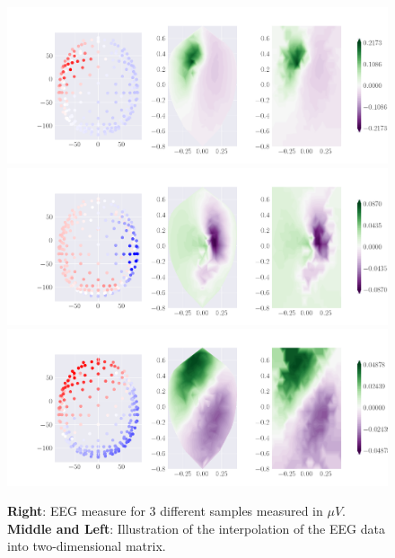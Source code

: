 \documentclass[a4paper, UKenglish, 11pt]{uiomaster}
\begin{document}
\begin{figure}[!htb]
\centering
\includegraphics[width=\linewidth]{../Code/plots/finals/new_eeg_dipole_pos_0.png}
\includegraphics[width=\linewidth]{../Code/plots/finals/new_eeg_dipole_pos_4.png}
\includegraphics[width=\linewidth]{../Code/plots/finals/new_eeg_dipole_pos_6.png}

\caption{\newline
\textbf{Right}: EEG measure for 3 different samples measured in $\mu V$. \newline
\textbf{Middle and Left}: Illustration of the interpolation of the EEG data into two-dimensional matrix.}
\label{fig:eeg_dipole_pos_0}

\end{figure}
\end{document}
